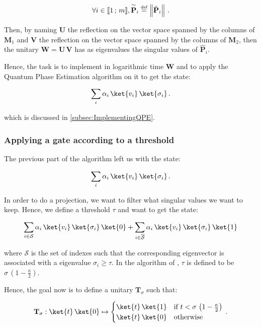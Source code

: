 \documentclass[11pt, a4paper]{article}
\begin{document}
                \[\forall i\in\llbracket1\,;\,m\rrbracket,\overset{\sim}{\mathbf{P}}_i\overset{\text{\tiny{def}}}{=}\left\|\hat{\mathbf{P}}_i\right\|\,.\]
                
                Then, by naming \(\mathbf{U}\) the reflection on the vector space spanned by the columns of \(\mathbf{M}_1\) and \(\mathbf{V}\) the reflection on the vector space spanned by the columns of \(\mathbf{M}_2\), then the unitary \(\mathbf{W} = \mathbf{U}\,\mathbf{V}\) has as eigenvalues the singular values of \(\hat{\mathbf{P}}_i\).
                
                Hence, the task is to implement in logarithmic time \(\mathbf{W}\) and to apply the Quantum Phase Estimation algorithm on it to get the state:
                
                \[\sum_{i}\alpha_i\,\ket{v_i}\,\ket{\sigma_i}\,.\]
                
                which is discussed in \autoref{subsec:ImplementingQPE}.
            \subsubsection{Applying a gate according to a threshold}
                The previous part of the algorithm left us with the state:
                
                \[\sum_{i}\alpha_i\,\ket{v_i}\,\ket{\sigma_i}\,.\]
                
                In order to do a projection, we want to filter what singular values we want to keep. Hence, we define a threshold \(\tau\) and want to get the state:
                
                \[\sum_{i\in\mathcal{S}}\alpha_i\,\ket{v_i}\,\ket{\sigma_i}\,\ket{0} + \sum_{i\in\overline{\mathcal{S}}}\alpha_i\,\ket{v_i}\,\ket{\sigma_i}\,\ket{1}\]
                
                where \(\mathcal{S}\) is the set of indexes such that the corresponding eigenvector is associated with a eigenvalue \(\sigma_i\geqslant\tau\). In the algorithm of \citeauthor{QRS}, \(\tau\) is defined to be \(\sigma\,\left(1-\frac\kappa2\right)\).
                
                Hence, the goal now is to define a unitary \(\mathbf{T}_\sigma\) such that:
                
                \[\mathbf{T}_\sigma:\ket{t}\,\ket{0}\mapsto\begin{cases}\ket{t}\,\ket{1} &\text{if } t < \sigma\,\left(1-\frac\kappa2\right)\\\ket{t}\,\ket{0}&\text{otherwise}\end{cases}\,.\]
                
\end{document}
